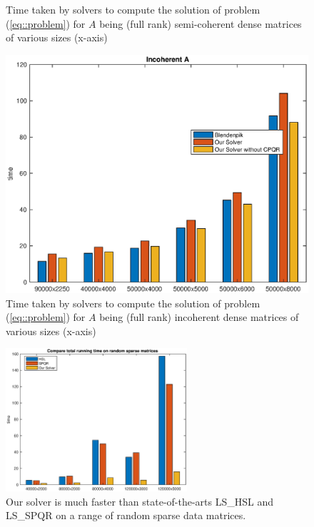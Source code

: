 \documentclass[english,11pt]{article}
\begin{document}
\begin{figure}[H]
\begin{minipage}{\mysize\textwidth}
        \caption{Time taken by solvers to compute the solution of problem (\ref{eq::problem}) for $A$ being (full rank) semi-coherent dense matrices of various sizes (x-axis)}
        \label{fig::compare_blen_semi-coherent}
    \end{minipage}
    \begin{minipage}{\mysize\textwidth}
        \centering
        \includegraphics[width=\textwidth]{images/dense_inco.eps} %
        \caption{Time taken by solvers to compute the solution of problem (\ref{eq::problem}) for $A$ being (full rank) incoherent dense matrices of various sizes (x-axis)}
        \label{fig::compare_blen_incoherent}
    \end{minipage}    
\end{figure}

\begin{figure}
\centering
\includegraphics[width=0.6\textwidth]{images/random_sparse_inco.eps}
\caption{Our solver is much faster than state-of-the-arts LS_HSL and LS_SPQR on a range of random sparse data matrices.}
\label{fig::sparse_rand}
\end{figure}
\end{document}
